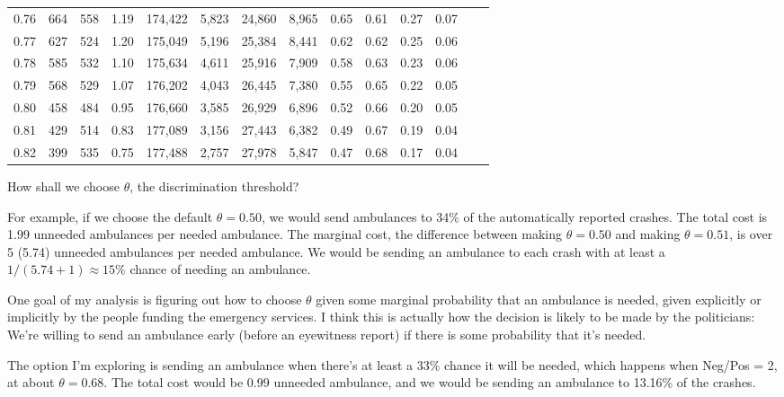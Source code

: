 \begin{center}
\begin{tabular}{rrrrrrrrrrrrrr}
\hline
0.76 &    664 &  558 &    1.19 &  174,422 &    5,823 &  24,860 &   8,965 &  0.65 &  0.61 &  0.27 &      0.07 \\
0.77 &    627 &  524 &    1.20 &  175,049 &    5,196 &  25,384 &   8,441 &  0.62 &  0.62 &  0.25 &      0.06 \\
0.78 &    585 &  532 &    1.10 &  175,634 &    4,611 &  25,916 &   7,909 &  0.58 &  0.63 &  0.23 &      0.06 \\
0.79 &    568 &  529 &    1.07 &  176,202 &    4,043 &  26,445 &   7,380 &  0.55 &  0.65 &  0.22 &      0.05 \\
0.80 &    458 &  484 &    0.95 &  176,660 &    3,585 &  26,929 &   6,896 &  0.52 &  0.66 &  0.20 &      0.05 \\
0.81 &    429 &  514 &    0.83 &  177,089 &    3,156 &  27,443 &   6,382 &  0.49 &  0.67 &  0.19 &      0.04 \\
0.82 &    399 &  535 &    0.75 &  177,488 &    2,757 &  27,978 &   5,847 &  0.47 &  0.68 &  0.17 &      0.04 \\
\bottomrule
\end{tabular}
\end{center}

How shall we choose $\theta$, the discrimination threshold?  

For example, if we choose the default $\theta = 0.50$, we would send ambulances to 34\% of the automatically reported crashes.  The total cost is 1.99 unneeded ambulances per needed ambulance.  The marginal cost, the difference between making $\theta = 0.50$ and making $\theta = 0.51$, is over 5 (5.74) unneeded ambulances per needed ambulance.  We would be sending an ambulance to each crash with at least a $1/(5.74+1) \approx 15\%$ chance of needing an ambulance.  

One goal of my analysis is figuring out how to choose $\theta$ given some marginal probability that an ambulance is needed, given explicitly or implicitly by the people funding the emergency services.  I think this is actually how the decision is likely to be made by the politicians:  We're willing to send an ambulance early (before an eyewitness report) if there is some probability that it's needed.  

The option I'm exploring is sending an ambulance when there's at least a 33\% chance it will be needed, which happens when Neg/Pos = 2, at about $\theta = 0.68$.  The total cost would be 0.99 unneeded ambulance, and we would be sending an ambulance to 13.16\% of the crashes.  

